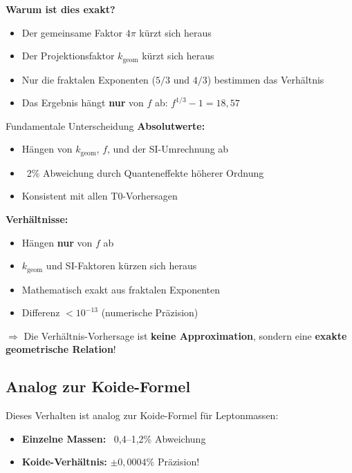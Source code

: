 	\textbf{Warum ist dies exakt?}
	
	\begin{itemize}
		\item Der gemeinsame Faktor $4\pi$ kürzt sich heraus
		\item Der Projektionsfaktor $k_{\text{geom}}$ kürzt sich heraus
		\item Nur die fraktalen Exponenten ($5/3$ und $4/3$) bestimmen das Verhältnis
		\item Das Ergebnis hängt \textbf{nur} von $f$ ab: $f^{1/3} - 1 = 18{,}57$
	\end{itemize}
	
	\begin{important}{Fundamentale Unterscheidung}
		\textbf{Absolutwerte:}
		\begin{itemize}
			\item Hängen von $k_{\text{geom}}$, $f$, und der SI-Umrechnung ab
			\item ~2\% Abweichung durch Quanteneffekte höherer Ordnung
			\item Konsistent mit allen T0-Vorhersagen
		\end{itemize}
		
		\textbf{Verhältnisse:}
		\begin{itemize}
			\item Hängen \textbf{nur} von $f$ ab
			\item $k_{\text{geom}}$ und SI-Faktoren kürzen sich heraus
			\item Mathematisch exakt aus fraktalen Exponenten
			\item Differenz $< 10^{-13}$ (numerische Präzision)
		\end{itemize}
		
		$\Rightarrow$ Die Verhältnis-Vorhersage ist \textbf{keine Approximation}, sondern eine \textbf{exakte geometrische Relation}!
	\end{important}
	
	\subsection{Analog zur Koide-Formel}
	
	Dieses Verhalten ist analog zur Koide-Formel für Leptonmassen:
	
	\begin{itemize}
		\item \textbf{Einzelne Massen:} ~0{,}4--1{,}2\% Abweichung
		\item \textbf{Koide-Verhältnis:} $\pm 0{,}0004\%$ Präzision!
	\end{itemize}
	

